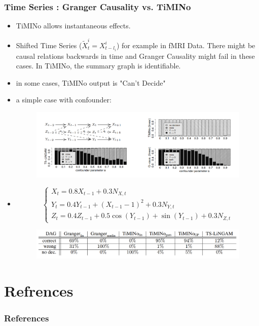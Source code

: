 \documentclass{beamer}
\newcommand{\eps}{{N}}
\begin{document}
\begin{frame}
\frametitle{Time Series : Granger Causality vs. TiMINo}
\begin{itemize}
\item TiMINo allows instantaneous effects.
\item Shifted Time Series ($\tilde{X}_t^i = X_{t-l_i}^i$) \hspace{0.5cm} for example in fMRI Data.  There might be causal relations backwards in time and Granger Causality might fail in these cases. In TiMINo, the summary graph is identifiable.
\item in some cases, TiMINo output is "Can't Decide"
\end{itemize}
\end{frame}



\begin{frame}
\begin{itemize}
\item a simple case with confounder:
\begin{figure}
	\includegraphics[scale=0.21]{timino.png}
\end{figure}

\item
\tiny{
\begin{equation*}
\begin{cases}
X_t=0.8 X_{t-1} + 0.3 \eps_{X,t}\\
Y_t=0.4 Y_{t-1} + (X_{t-1}-1)^2 +0.3\eps_{Y,t}\\
Z_t=0.4 Z_{t-1} + 0.5 \cos(Y_{t-1}) + \sin(Y_{t-1}) +0.3\eps_{Z,t}
\end{cases}
\end{equation*}
\begin{figure}
	\includegraphics[scale=0.2]{nonlin.png}
\end{figure}
}
\end{itemize}
\end{frame}
\section{Refrences}
\begin{frame}
\frametitle{References}
\scriptsize{


}
\end{frame}
\end{document}
